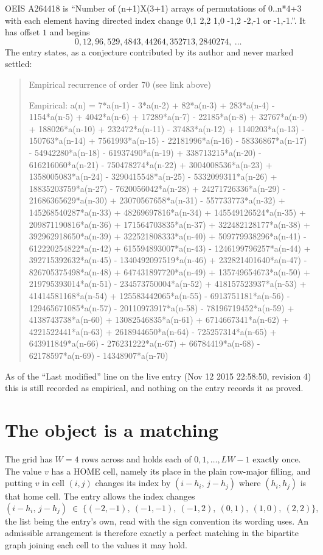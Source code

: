 \documentclass[11pt,a4paper]{article}
\theoremstyle{plain}
\theoremstyle{definition}
\begin{document}
OEIS A264418 is ``Number of (n+1)X(3+1) arrays of permutations of 0..n*4+3 with each element having directed index change 0,1 2,2 1,0 -1,2 -2,-1 or -1,-1.''. It has offset $1$ and begins
\[
0, 12, 96, 529, 4843, 44264, 352713, 2840274,\ \dots
\]
The entry states, as a conjecture contributed by its author and never marked settled:
\begin{quote}
Empirical recurrence of order 70 (see link above)

Empirical: a(n) = 7*a(n-1) - 3*a(n-2) + 82*a(n-3) + 283*a(n-4) - 1154*a(n-5) + 4042*a(n-6) + 17289*a(n-7) - 22185*a(n-8) + 32767*a(n-9) + 188026*a(n-10) + 232472*a(n-11) - 37483*a(n-12) + 1140203*a(n-13) - 150763*a(n-14) + 7561993*a(n-15) - 22181996*a(n-16) - 58336867*a(n-17) - 54942280*a(n-18) - 61937490*a(n-19) + 338713215*a(n-20) - 616216060*a(n-21) - 750478274*a(n-22) + 3004008536*a(n-23) + 1358005083*a(n-24) - 3290415548*a(n-25) - 5332099311*a(n-26) + 18835203759*a(n-27) - 7620056042*a(n-28) + 24271726336*a(n-29) - 21686365629*a(n-30) + 23070567658*a(n-31) - 557733773*a(n-32) + 145268540287*a(n-33) + 48269697816*a(n-34) + 145549126524*a(n-35) + 209871190816*a(n-36) + 171564703835*a(n-37) + 322482128177*a(n-38) + 392962918650*a(n-39) + 322521808333*a(n-40) + 509779938296*a(n-41) - 612220254822*a(n-42) + 615594893007*a(n-43) - 1246199796257*a(n-44) + 392715392632*a(n-45) - 1340492097519*a(n-46) + 232821401640*a(n-47) - 826705375498*a(n-48) + 647431897720*a(n-49) + 135749654673*a(n-50) + 219795393014*a(n-51) - 234573750004*a(n-52) + 418157523937*a(n-53) + 41414581168*a(n-54) + 125583442065*a(n-55) - 6913751181*a(n-56) - 129465671085*a(n-57) - 20110973917*a(n-58) - 78196719452*a(n-59) + 4138743738*a(n-60) + 13082546835*a(n-61) + 6714667341*a(n-62) + 4221522441*a(n-63) + 2618944650*a(n-64) - 725257314*a(n-65) + 643911849*a(n-66) - 276231222*a(n-67) + 66784419*a(n-68) - 62178597*a(n-69) - 14348907*a(n-70)
\end{quote}
As of the ``Last modified'' line on the live entry (Nov 12 2015 22:58:50, revision 4) this is still
recorded as empirical, and nothing on the entry records it as proved.

\section{The object is a matching}

The grid has $W=4$ rows across and holds each of $0,1,\dots,LW-1$ exactly once. The value
$v$ has a HOME cell, namely its place in the plain row-major filling, and putting $v$ in cell
$(i,j)$ changes its index by $(i-h_i,\,j-h_j)$ where $(h_i,h_j)$ is that home cell. The entry
allows the index changes
\[
(i-h_i,\,j-h_j)\;\in\;\{(-2,-1),\ (-1,-1),\ (-1,2),\ (0,1),\ (1,0),\ (2,2)\},
\]
the list being the entry's own, read with the sign convention its wording uses. An admissible
arrangement is therefore exactly a perfect matching in the bipartite graph joining each cell to
the values it may hold.
\end{document}
